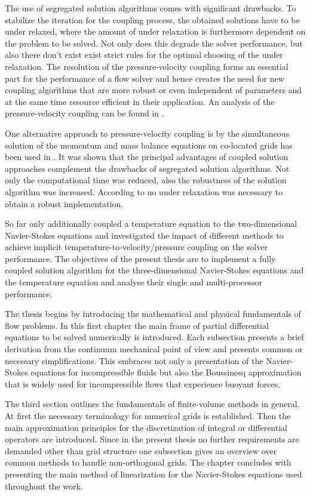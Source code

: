 The use of segregated solution algorithms comes with significant drawbacks. To stabilize the iteration for the coupling process, the obtained solutions have to be under relaxed, where the amount of under relaxation is furthermore dependent on the problem to be solved. Not only does this degrade the solver performance, but also there don't exist exist strict rules for the optimal choosing of the under relaxation. The resolution of the pressure-velocity coupling forms an essential part for the performance of a flow solver and hence creates the need for new coupling algorithms that are more robust or even independent of parameters and at the same time resource efficient in their application. An analysis of the pressure-velocity coupling can be found in \cite{peric90}.

One alternative approach to pressure-velocity coupling is by the simultaneous solution of the momentum and mass balance equations on co-located grids has been used in \cite{chen10,darwish09,falk13,galpin86,klaij13,mangani14,vakilipour12}. It was shown that the principal advantages of coupled solution approaches complement the drawbacks of segregated solution algorithms. Not only the computational time was reduced, also the robustness of the solution algorithm was increased. According to \cite{darwish09} no under relaxation was necessary to obtain a robust implementation. 

So far only \cite{galpin86,vakilipour12} additionally coupled a temperature equation to the two-dimensional Navier-Stokes equations and investigated the impact of different methods to achieve implicit temperature-to-velocity/pressure coupling on the solver performance. The objectives of the present thesis are to implement a fully coupled solution algorithm for the three-dimensional Navier-Stokes equations and the temperature equation and analyse their single and multi-processor performance.

The thesis begins by introducing the mathematical and physical fundamentals of flow problems. In this first chapter the main frame of partial differential equations to be solved numerically is introduced. Each subsection presents a brief derivation from the continuum mechanical point of view and presents common or necessary simplifications. This embraces not only a presentation of the Navier-Stokes equations for incompressible fluids but also the Boussinesq approximation that is widely used for incompressible flows that experience buoyant forces.

The third section outlines the fundamentals of finite-volume methods in general. At first the necessary terminology for numerical grids is established. Then the main approximation principles for the discretization of integral or differential operators are introduced. Since in the present thesis no further requirements are demanded other than grid structure one subsection gives an overview over common methods to handle non-orthogonal grids. The chapter concludes with presenting the main method of linearization for the Navier-Stokes equations used throughout the work.

